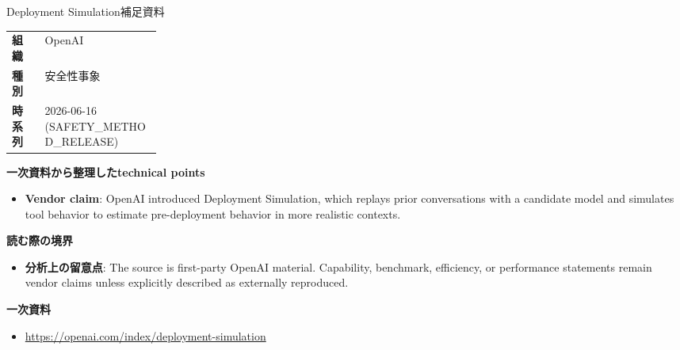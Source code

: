 \begin{technicalnote}{Deployment Simulation}{補足資料}
\begin{tabularx}{\linewidth}{@{}>{\bfseries}p{0.22\linewidth}X@{}}
組織 & OpenAI \\
種別 & 安全性事象 \\
時系列 & 2026-06-16 (SAFETY\_METHOD\_RELEASE) \\
\end{tabularx}
\smallskip
{\bfseries 一次資料から整理したtechnical points}
\begin{itemize}[leftmargin=1.5em,itemsep=0.35em]
\item \textbf{Vendor claim}: OpenAI introduced Deployment Simulation, which replays prior conversations with a candidate model and simulates tool behavior to estimate pre-deployment behavior in more realistic contexts.
\end{itemize}
{\bfseries 読む際の境界}
\begin{itemize}[leftmargin=1.5em,itemsep=0.35em]
\item \textbf{分析上の留意点}: The source is first-party OpenAI material. Capability, benchmark, efficiency, or performance statements remain vendor claims unless explicitly described as externally reproduced.
\end{itemize}
{\bfseries 一次資料}
\begingroup\sloppy
\begin{itemize}[leftmargin=1.5em,itemsep=0.25em]
\item {\scriptsize\url{https://openai.com/index/deployment-simulation}}
\end{itemize}
\endgroup
\end{technicalnote}
\medskip
